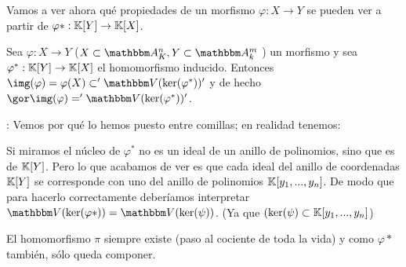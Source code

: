 Vamos a ver ahora qué propiedades de un morfismo $\varphi: X \rightarrow Y$ se pueden ver a partir de $\varphi*: \mathbb{K}[Y] \rightarrow \mathbb{K}[X]$.

\begin{lemma}[Clave]
	Sea  $\varphi: X \rightarrow Y$ ($X  \subset \Akn, Y \subset \A_k^m$ ) un morfismo y sea $\varphi^*:\mathbb{K}[Y] \rightarrow \mathbb{K}[X]$ el homomorfismo inducido. Entonces $\img(\varphi)=\varphi(X) \subset '\V(\ker (\varphi^*))'$ y de hecho $\cls{\img(\varphi)}='\V(\ker(\varphi^*))'$.
\end{lemma}

	\notacion: Vemos por qué lo hemos puesto entre comillas; en realidad tenemos:
	
	
	Si miramos el núcleo de $\varphi^*$ no es un ideal de un anillo de polinomios, sino que es de $\mathbb{K}[Y]$. Pero lo que acabamos de ver es que cada ideal del anillo de coordenadas $\mathbb{K}[Y]$ se corresponde con uno del anillo de polinomios $\mathbb{K}[y_1,...,y_n]$. De modo que para hacerlo correctamente deberíamos interpretar $\V(\ker(\varphi*))= \V(\ker(\psi))$. (Ya que $(\ker(\psi) \subset \mathbb{K}[y_1,...,y_n]$)
	
	El homomorfismo $\pi$ siempre existe (paso al cociente de toda la vida) y como $\varphi*$ también, sólo queda componer.
	
